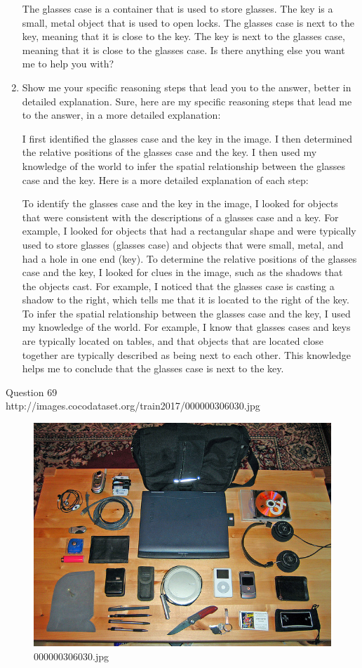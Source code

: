 \begin{enumerate}
    The glasses case is a container that is used to store glasses.
    The key is a small, metal object that is used to open locks.
    The glasses case is next to the key, meaning that it is close to the key.
    The key is next to the glasses case, meaning that it is close to the glasses case.
    Is there anything else you want me to help you with?
    \item Show me your specific reasoning steps that lead you to the answer, better in detailed explanation.
    \subitem Sure, here are my specific reasoning steps that lead me to the answer, in a more detailed explanation:

    I first identified the glasses case and the key in the image.
    I then determined the relative positions of the glasses case and the key.
    I then used my knowledge of the world to infer the spatial relationship between the glasses case and the key.
    Here is a more detailed explanation of each step:
    
    To identify the glasses case and the key in the image, I looked for objects that were consistent with the descriptions of a glasses case and a key. For example, I looked for objects that had a rectangular shape and were typically used to store glasses (glasses case) and objects that were small, metal, and had a hole in one end (key).
    To determine the relative positions of the glasses case and the key, I looked for clues in the image, such as the shadows that the objects cast. For example, I noticed that the glasses case is casting a shadow to the right, which tells me that it is located to the right of the key.
    To infer the spatial relationship between the glasses case and the key, I used my knowledge of the world. For example, I know that glasses cases and keys are typically located on tables, and that objects that are located close together are typically described as being next to each other. This knowledge helps me to conclude that the glasses case is next to the key.
\end{enumerate}
Question 69\\
http://images.cocodataset.org/train2017/000000306030.jpg
\begin{figure}[h]
    \centering
    \includegraphics[width=0.8\linewidth]{../image set/hard/000000306030.jpg}
    \caption{000000306030.jpg}
\end{figure}
